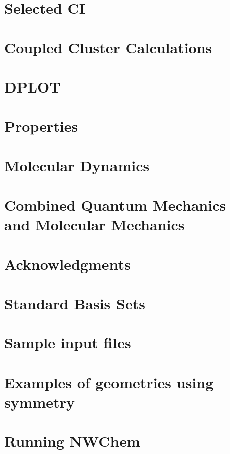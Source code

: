 \chapter{Selected CI}


\chapter{Coupled Cluster Calculations}


\chapter{DPLOT}


\chapter{Properties}


\chapter{Molecular Dynamics}


\chapter{Combined Quantum Mechanics and Molecular Mechanics}


\clearpage
\chapter{Acknowledgments}

\clearpage

\appendix

\chapter{Standard Basis Sets}


\chapter{Sample input files}


\chapter{Examples of geometries using symmetry}


\chapter{Running NWChem}



